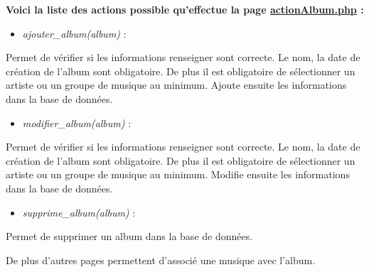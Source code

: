 			\begin{paragraphe}
                \textbf{Voici la liste des actions possible qu'effectue la page \underline{actionAlbum.php} :}
            
                \begin{itemize}
                    \item \emph{ajouter\_album(album)} :
                \end{itemize}
                \begin{paragraphe}
                    Permet de vérifier si les informations renseigner sont correcte. Le nom, la date de création de l'album sont obligatoire. De plus il est obligatoire de sélectionner un artiste ou un groupe de musique au minimum. Ajoute ensuite les informations dans la base de données.
                \end{paragraphe}
                
                \begin{itemize}
                    \item \emph{modifier\_album(album)} :
                \end{itemize}
                \begin{paragraphe}
                    Permet de vérifier si les informations renseigner sont correcte. Le nom, la date de création de l'album sont obligatoire. De plus il est obligatoire de sélectionner un artiste ou un groupe de musique au minimum. Modifie ensuite les informations dans la base de données.
                \end{paragraphe}
                
                \begin{itemize}
                    \item \emph{supprime\_album(album)} :
                \end{itemize}
                \begin{paragraphe}
                    Permet de supprimer un album dans la base de données.
                \end{paragraphe}
            \end{paragraphe}
            
            \begin{paragraphe}
                De plus d'autres pages permettent d'associé une musique avec l'album.
            \end{paragraphe}

